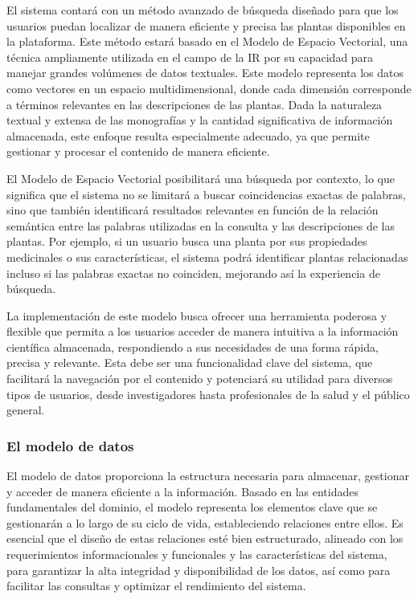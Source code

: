El sistema contará con un método avanzado de búsqueda diseñado para que los usuarios puedan localizar de manera eficiente y 
precisa las plantas disponibles en la plataforma. Este método estará basado en el Modelo de Espacio Vectorial, una técnica 
ampliamente utilizada en el campo de la IR por su capacidad para manejar grandes volúmenes de datos textuales. 
Este modelo representa los datos como vectores en un espacio multidimensional, donde cada dimensión corresponde a términos 
relevantes en las descripciones de las plantas. Dada la naturaleza textual y extensa de las monografías y la cantidad 
significativa de información almacenada, este enfoque resulta especialmente adecuado, ya que permite gestionar y 
procesar el contenido de manera eficiente.

El Modelo de Espacio Vectorial posibilitará una búsqueda por contexto, lo que significa que el sistema no se limitará a 
buscar coincidencias exactas de palabras, sino que también identificará resultados relevantes en función de la relación 
semántica entre las palabras utilizadas en la consulta y las descripciones de las plantas. Por ejemplo, si un usuario 
busca una planta por sus propiedades medicinales o sus características, el sistema podrá identificar plantas relacionadas 
incluso si las palabras exactas no coinciden, mejorando así la experiencia de búsqueda.

La implementación de este modelo busca ofrecer una herramienta poderosa y flexible que permita a los usuarios acceder 
de manera intuitiva a la información científica almacenada, respondiendo a sus necesidades de una forma rápida, 
precisa y relevante. Esta debe ser una funcionalidad clave del sistema, que facilitará la navegación por el contenido 
y potenciará su utilidad para diversos tipos de usuarios, desde investigadores hasta profesionales de la salud y 
el público general.


\subsubsection{El modelo de datos}
El modelo de datos proporciona la estructura necesaria para almacenar, gestionar y acceder de manera eficiente a la información. 
Basado en las entidades fundamentales del dominio, el modelo representa los elementos clave que se gestionarán a lo largo de su 
ciclo de vida, estableciendo relaciones entre ellos. Es esencial que el diseño de estas relaciones esté bien estructurado, 
alineado con los requerimientos informacionales y funcionales y las características del sistema, para garantizar la alta integridad y disponibilidad 
de los datos, así como para facilitar las consultas y optimizar el rendimiento del sistema.

